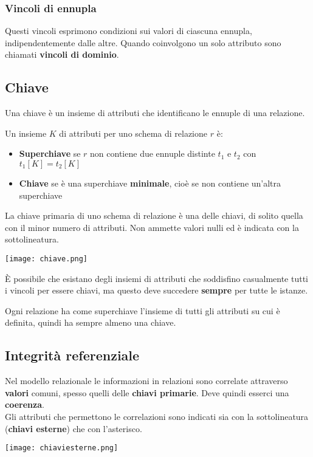 \subsubsection{Vincoli di ennupla}
Questi vincoli esprimono condizioni sui valori di ciascuna ennupla, indipendentemente dalle altre. Quando coinvolgono un solo attributo sono chiamati \textbf{vincoli di dominio}.

\newpage
\subsection{Chiave}
Una chiave è un insieme di attributi che identificano le ennuple di una relazione.
\begin{definition}[Chiave]
	Un insieme $K$ di attributi per uno schema di relazione $r$ è:
	\begin{itemize}
		\item \textbf{Superchiave} se $r$ non contiene due ennuple distinte $t_1$ e $t_2$ con $t_1[K]=t_2[K]$
		\item \textbf{Chiave} se è una superchiave \textbf{minimale}, cioè se non contiene un'altra superchiave
	\end{itemize}
\end{definition}
\begin{definition}
	La chiave primaria di uno schema di relazione è una delle chiavi, di solito quella con il minor numero di attributi. Non ammette valori nulli ed è indicata con la sottolineatura.
\end{definition}

\begin{center}
	\texttt{[image: chiave.png]}
\end{center}

\begin{note}
	È possibile che esistano degli insiemi di attributi che soddisfino casualmente tutti i vincoli per essere chiavi, ma questo deve succedere \textbf{sempre} per tutte le istanze.
\end{note}

\begin{observation}[Esistenza]
	Ogni relazione ha come superchiave l'insieme di tutti gli attributi su cui è definita, quindi ha sempre almeno una chiave.
\end{observation}

\subsection{Integrità referenziale}
Nel modello relazionale le informazioni in relazioni sono correlate attraverso \textbf{valori} comuni, spesso quelli delle \textbf{chiavi primarie}. Deve quindi esserci una \textbf{coerenza}.\\
Gli attributi che permettono le correlazioni sono indicati sia con la sottolineatura (\textbf{chiavi esterne}) che con l'asterisco.
\begin{center}
	\texttt{[image: chiaviesterne.png]}
\end{center}

